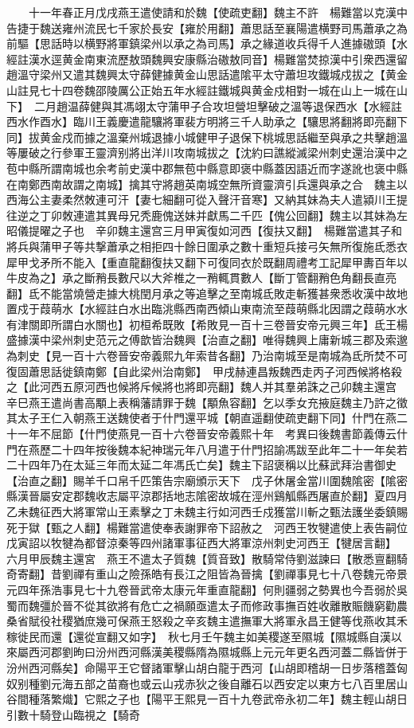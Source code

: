 　　十一年春正月戊戌燕王遣使請和於魏【使疏吏翻】魏主不許　楊難當以克漢中告捷于魏送雍州流民七千家於長安【雍於用翻】蕭思話至襄陽遣横野司馬蕭承之為前驅【思話時以横野將軍鎮梁州以承之為司馬】承之緣道收兵得千人進據磝頭【水經註漢水逕黄金南東流歷敖頭魏興安康縣治磝敖同音】楊難當焚掠漢中引衆西還留趙溫守梁州又遣其魏興太守薛健據黄金山思話遣隂平太守蕭坦攻鐵城戍拔之【黄金山註見七十四卷魏邵陵厲公正始五年水經註鐵城與黄金戍相對一城在山上一城在山下】　二月趙温薛健與其馮翊太守蒲甲子合攻坦營坦擊破之溫等退保西水【水經註西水作酉水】臨川王義慶遣龍驤將軍裴方明將三千人助承之【驤思將翻將即亮翻下同】拔黄金戍而據之溫棄州城退據小城健甲子退保下桃城思話繼至與承之共擊趙溫等屢破之行參軍王靈濟别將出洋川攻南城拔之【沈約曰譙縱滅梁州刺史還治漢中之苞中縣所謂南城也余考前史漢中郡無苞中縣意即褒中縣蓋因語近而字遂訛也褒中縣在南鄭西南故謂之南城】擒其守將趙英南城空無所資靈濟引兵還與承之合　魏主以西海公主妻柔然敇連可汗【妻七細翻可從入聲汗音寒】又納其妹為夫人遣潁川王提往逆之丁卯敇連遣其異母兄秃鹿傀送妹并獻馬二千匹【傀公回翻】魏主以其妹為左昭儀提曜之子也　辛卯魏主還宫三月甲寅復如河西【復扶又翻】　楊難當遣其子和將兵與蒲甲子等共撃蕭承之相拒四十餘日圍承之數十重短兵接弓矢無所復施氐悉衣犀甲戈矛所不能入【重直龍翻復扶又翻下可復同衣於既翻周禮考工記犀甲夀百年以牛皮為之】承之斷矟長數尺以大斧椎之一矟輒貫數人【斷丁管翻矟色角翻長直亮翻】氐不能當燒營走據大桃閏月承之等追擊之至南城氐敗走斬獲甚衆悉收漢中故地置戍于葭萌水【水經註白水出臨洮縣西南西傾山東南流至葭萌縣北因謂之葭萌水水有津關即所謂白水關也】初桓希既敗【希敗見一百十三卷晉安帝元興三年】氐王楊盛據漢中梁州刺史范元之傅歆皆治魏興【治直之翻】唯得魏興上庸新城三郡及索邈為刺史【見一百十六卷晉安帝義熙九年索昔各翻】乃治南城至是南城為氐所焚不可復固蕭思話徙鎮南鄭【自此梁州治南鄭】　甲戌赫連昌叛魏西走丙子河西候將格殺之【此河西五原河西也候將斥候將也將即亮翻】魏人并其羣弟誅之己卯魏主還宫　辛巳燕王遣尚書高顒上表稱藩請罪于魏【顒魚容翻】乞以季女充掖庭魏主乃許之徵其太子王仁入朝燕王送魏使者于什門還平城【朝直遥翻使疏吏翻下同】什門在燕二十一年不屈節【什門使燕見一百十六卷晉安帝義熙十年　考異曰後魏書節義傳云什門在燕歷二十四年按後魏本紀神瑞元年八月遣于什門招諭馮跋至此年二十一年矣若二十四年乃在太延三年而太延二年馮氏亡矣】魏主下詔褒稱以比蘇武拜治書御史【治直之翻】賜羊千口帛千匹策告宗廟頒示天下　戊子休屠金當川圍魏隂密【隂密縣漢晉屬安定郡魏收志屬平涼郡括地志隂密故城在涇州鷄觚縣西屠直於翻】夏四月乙未魏征西大將軍常山王素擊之丁未魏主行如河西壬戍獲當川斬之甄法護坐委鎮賜死于獄【甄之人翻】楊難當遣使奉表謝罪帝下詔赦之　河西王牧犍遣使上表告嗣位戊寅詔以牧犍為都督涼秦等四州諸軍事征西大將軍涼州刺史河西王【犍居言翻】　六月甲辰魏主還宮　燕王不遣太子質魏【質音致】散騎常侍劉滋諫曰【散悉亶翻騎奇寄翻】昔劉禪有重山之險孫皓有長江之阻皆為晉擒【劉禪事見七十八卷魏元帝景元四年孫浩事見七十九卷晉武帝太康元年重直龍翻】何則疆弱之勢異也今吾弱於吳蜀而魏彊於晉不從其欲將有危亡之禍願亟遣太子而修政事撫百姓收離散賑饑窮勸農桑省賦役社稷猶庶幾可保燕王怒殺之辛亥魏主遣撫軍大將軍永昌王健等伐燕收其禾稼徙民而還【還從宣翻又如字】　秋七月壬午魏主如美稷遂至隰城【隰城縣自漢以來屬西河郡劉昫曰汾州西河縣漢美稷縣隋為隰城縣上元元年更名西河蓋二縣皆併于汾州西河縣矣】命陽平王它督諸軍擊山胡白龍于西河【山胡即稽胡一日步落稽蓋匈奴别種劉元海五部之苗裔也或云山戎赤狄之後自離石以西安定以東方七八百里居山谷間種落繁熾】它熙之子也【陽平王熙見一百十九卷武帝永初二年】魏主輕山胡日引數十騎登山臨視之【騎奇